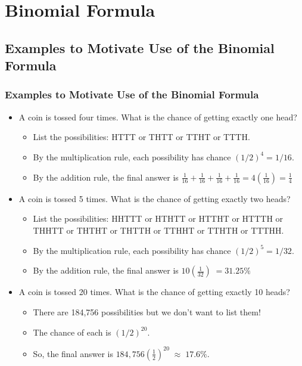 \documentclass[t]{beamer}
\begin{document}
\section{Binomial Formula}
\subsection{Examples to Motivate Use of the Binomial Formula}
\begin{frame}
\frametitle{Examples to Motivate Use of the Binomial Formula}
{\small
\begin{itemize}
\item A coin is tossed four times.  What is the chance of getting exactly one head?
   \begin{itemize}
   \item \footnotesize List the possibilities:  HTTT or THTT or TTHT or TTTH.\\[3pt]
   \item \footnotesize By the multiplication rule, each possibility has chance $(1/2)^4=1/16$.\\[3pt]
   \item \footnotesize By the addition rule, the final answer is $\frac{1}{16}+\frac{1}{16}+\frac{1}{16}+\frac{1}{16} 
       = 4\left(\frac{1}{16}\right)=\frac{1}{4}$\\[3pt]
   \end{itemize}
\item A coin is tossed 5 times.  What is the chance of getting exactly two heads?
   \begin{itemize}
   \item \footnotesize List the possibilities:  HHTTT or HTHTT or HTTHT or HTTTH or THHTT or THTHT or THTTH or TTHHT
            or TTHTH or TTTHH.\\[3pt]
   \item \footnotesize By the multiplication rule, each possibility has chance $(1/2)^5=1/32$.\\[3pt]
   \item \footnotesize By the addition rule, the final answer is $10\left(\frac{1}{32}\right)\;=31.25\%$\\[3pt]
   \end{itemize}
\item A coin is tossed 20 times.  What is the chance of getting exactly 10 heads?
   \begin{itemize}
   \item \footnotesize There are 184,756 possibilities but we don't want to list them!\\[3pt]
   \item \footnotesize The chance of each is $(1/2)^{20}$.\\[3pt]
   \item \footnotesize  So, the final answer is $184,\!756\left(\frac{1}{2}\right)^{20}\;\approx\;17.6\%$.
   \end{itemize}
\end{itemize}}
\end{frame}
\end{document}
